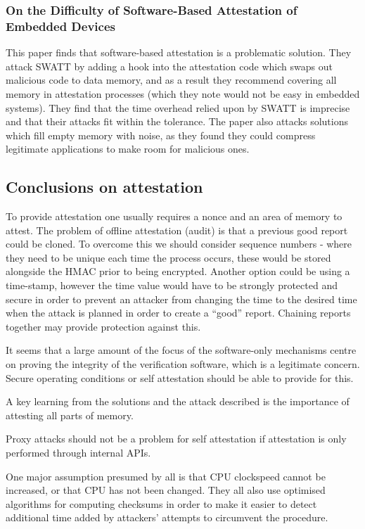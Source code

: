 \subsubsection*{On the Difficulty of Software-Based Attestation of Embedded Devices}

This paper \cite{Castelluccia2009} finds that software-based attestation is a problematic solution. They attack SWATT \cite{Seshadri2004} by adding a hook into the attestation code which swaps out malicious code to data memory, and as a result they recommend covering all memory in attestation processes (which they note would not be easy in embedded systems). They find that the time overhead relied upon by SWATT \cite{Seshadri2004} is imprecise and that their attacks fit within the tolerance. The paper also attacks solutions which fill empty memory with noise, as they found they could compress legitimate applications to make room for malicious ones.

\subsection{Conclusions on attestation} \label{attestationConclusion}

To provide attestation one usually requires a nonce and an area of memory to attest. The problem of offline attestation (audit) is that a previous good report could be cloned. To overcome this we should consider sequence numbers - where they need to be unique each time the process occurs, these would be stored alongside the HMAC prior to being encrypted. Another option could be using a time-stamp, however the time value would have to be strongly protected and secure in order to prevent an attacker from changing the time to the desired time when the attack is planned in order to create a ``good'' report. Chaining reports together may provide protection against this.

It seems that a large amount of the focus of the software-only mechanisms centre on proving the integrity of the verification software, which is a legitimate concern. Secure operating conditions or self attestation should be able to provide for this.

A key learning from the solutions and the attack described is the importance of attesting all parts of memory.

Proxy attacks should not be a problem for self attestation if attestation is only performed through internal APIs.

One major assumption presumed by all is that CPU clockspeed cannot be increased, or that CPU has not been changed. They all also use optimised algorithms for computing checksums in order to make it easier to detect additional time added by attackers' attempts to circumvent the procedure.